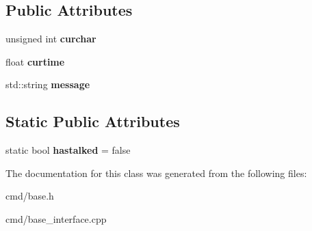 \subsection*{Public Attributes}
\begin{DoxyCompactItemize}
\item 
unsigned int {\bfseries curchar}\hypertarget{classBaseInterface_1_1Room_1_1BaseTalk_aea1f19e0158f136a8e11edc083b8617d}{}\label{classBaseInterface_1_1Room_1_1BaseTalk_aea1f19e0158f136a8e11edc083b8617d}

\item 
float {\bfseries curtime}\hypertarget{classBaseInterface_1_1Room_1_1BaseTalk_afda4fb3b2b28f09501a9d0d3b0be4610}{}\label{classBaseInterface_1_1Room_1_1BaseTalk_afda4fb3b2b28f09501a9d0d3b0be4610}

\item 
std\+::string {\bfseries message}\hypertarget{classBaseInterface_1_1Room_1_1BaseTalk_a5efa242e02dc65902478995275a22468}{}\label{classBaseInterface_1_1Room_1_1BaseTalk_a5efa242e02dc65902478995275a22468}

\end{DoxyCompactItemize}
\subsection*{Static Public Attributes}
\begin{DoxyCompactItemize}
\item 
static bool {\bfseries hastalked} = false\hypertarget{classBaseInterface_1_1Room_1_1BaseTalk_a8bf2f39ca317f50b63b099e01dc913ec}{}\label{classBaseInterface_1_1Room_1_1BaseTalk_a8bf2f39ca317f50b63b099e01dc913ec}

\end{DoxyCompactItemize}


The documentation for this class was generated from the following files\+:\begin{DoxyCompactItemize}
\item 
cmd/base.\+h\item 
cmd/base\+\_\+interface.\+cpp\end{DoxyCompactItemize}

